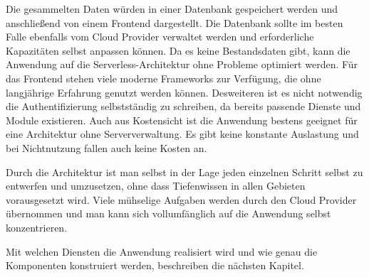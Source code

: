 Die gesammelten Daten würden in einer Datenbank gespeichert werden und anschließend von einem Frontend dargestellt.
Die Datenbank sollte im besten Falle ebenfalls vom Cloud Provider verwaltet werden und erforderliche Kapazitäten selbst anpassen können.
Da es keine Bestandsdaten gibt, kann die Anwendung auf die Serverless-Architektur ohne Probleme optimiert werden.
Für das Frontend stehen viele moderne Frameworks zur Verfügung, die ohne langjährige Erfahrung genutzt werden können.
Desweiteren ist es nicht notwendig die Authentifizierung selbstständig zu schreiben, da bereits passende Dienste und Module existieren.
Auch aus Kostensicht ist die Anwendung bestens geeignet für eine Architektur ohne Serververwaltung.
Es gibt keine konstante Auslastung und bei Nichtnutzung fallen auch keine Kosten an.


Durch die Architektur ist man selbst in der Lage jeden einzelnen Schritt selbst zu entwerfen und umzusetzen, ohne dass Tiefenwissen in allen Gebieten vorausgesetzt wird.
Viele mühselige Aufgaben werden durch den Cloud Provider übernommen und man kann sich vollumfänglich auf die Anwendung selbst konzentrieren.

Mit welchen Diensten die Anwendung realisiert wird und wie genau die Komponenten konstruiert werden, beschreiben die nächsten Kapitel.



